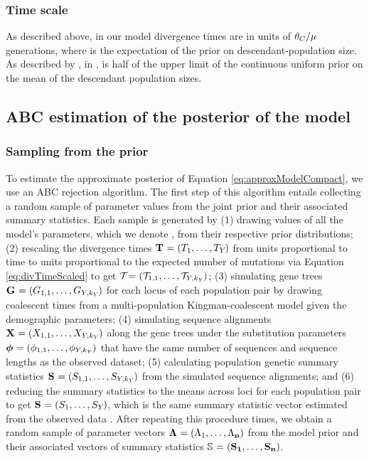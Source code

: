 \subsubsection*{Time scale}
As described above, in our model divergence times are in units of
$\theta_{C}/\mu$ generations, where  is the expectation
of the prior on descendant-population size.
As described by \citet{Oaks2012}, in \msb,  is half of the upper
limit of the continuous uniform prior on the mean of the descendant population
sizes.

\subsection*{ABC estimation of the posterior of the model}
\subsubsection*{Sampling from the prior}
To estimate the approximate posterior of Equation \ref{eq:approxModelCompact},
we use an ABC rejection algorithm.
The first step of this algorithm entails collecting a random sample of
parameter values from the joint prior and their associated summary
statistics.
Each sample is generated by
(1) drawing values of all the model's parameters, which we denote \hpvector{},
from their respective prior distributions;
(2) rescaling the divergence times
$\mathbf{T_{}} = (T_{1}, \ldots, T_{Y_{}})$
from units proportional to time to units proportional to the expected number
of mutations via Equation \ref{eq:divTimeScaled} to get 
$\divTimeScaledVector = (\divTimeScaled{1}{1}, \ldots,
\divTimeScaled{\npairs{}}{\nloci{\npairs{}}})$;
(3) simulating gene trees $\geneTreeVector = (\geneTree{1}{1}, \ldots, 
\geneTree{\npairs{}}{\nloci{\npairs{}}})$
for each locus of each population pair by drawing coalescent times from
a multi-population Kingman-coalescent model given the demographic parameters;
(4) simulating sequence alignments 
$\alignmentVector = (\alignment{1}{1}, \ldots, \alignment{\npairs{}}{\nloci{\npairs{}}})$
along the gene trees under the
\hky substitution parameters
$\hkyModelVector = (\hkyModel{1}{1}, \ldots, \hkyModel{\npairs{}}{\nloci{\npairs{}}})$
that have the same number of sequences and sequence lengths as the observed
dataset;
(5) calculating population genetic summary statistics
$\ssVector{} = (\alignmentSS{1}{1}, \ldots, \alignmentSS{\npairs{}}{\nloci{\npairs{}}})$
from the simulated sequence alignments;
and (6) reducing the summary statistics to the means across loci for each
population pair to get
$\ssVector{} = (\alignmentSS{1}{}, \ldots, \alignmentSS{\npairs{}}{})$, which is
the same summary statistic vector estimated from the observed data \ssVectorObs.
After repeating this procedure \numPriorSamples times, we obtain a random
sample of parameter vectors
$\boldsymbol{\Lambda_{}} = (\Lambda_{1}, \ldots, \Lambda_{\mathbf{n}})$
from the model prior and their associated vectors of summary statistics
$\ssMatrix = (\ssVector{1}, \ldots, \ssVector{\numPriorSamples})$.


